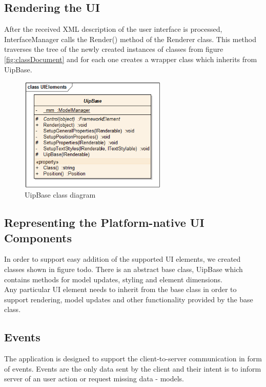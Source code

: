 \subsection{Rendering the UI}
After the received XML description of the user interface is processed, InterfaceManager calls the Render() method of the Renderer class. This method traverses the tree of the newly created instances of classes from figure \ref{fig:classDocument} and for each one creates a wrapper class which inherits from UipBase. 

\begin{figure}[ht!]
\centering
\includegraphics[width=70mm]{pics/3/classUipBase.png}
\caption{UipBase class diagram}
\label{fig:classUipBase}
\end{figure}


\subsection{Representing the Platform-native UI Components}
In order to support easy addition of the supported UI elements, we created classes shown in figure todo. There is an abstract base class, UipBase which contains methods for model updates, styling and element dimensions.\\
Any particular UI element needs to inherit from the base class in order to support rendering, model updates and other functionality provided by the base class.

\subsection{Events}
The application is designed to support the client-to-server communication in form of events. Events are the only data sent by the client and their intent is to inform server of an user action or request missing data - models.\\

